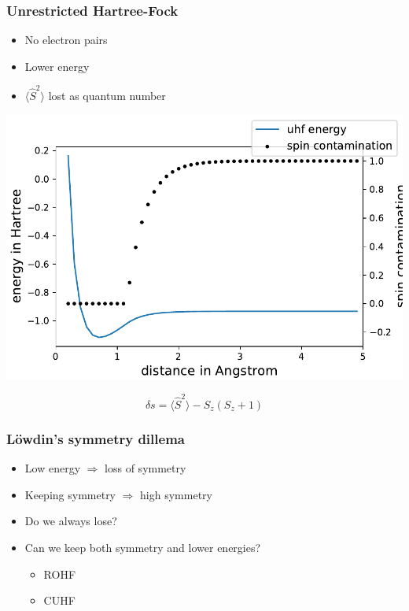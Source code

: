 \documentclass[aspectratio=169]{beamer}
\begin{document}
\begin{frame}
    \frametitle{Unrestricted Hartree-Fock}
    \begin{itemize}
        \item No electron pairs
        \item Lower energy
        \item $\langle\hat{S}^2\rangle$ lost as quantum number
    \end{itemize}
    \begin{minipage}[b]{0.6\linewidth}
        \includegraphics[width=\linewidth]{./figures/uhf.pdf}
    \end{minipage}
    \begin{minipage}[b]{0.35\linewidth}
        \begin{equation}
            \delta s = \langle \hat{S}^2 \rangle - S_z(S_z + 1)
        \end{equation}
    \end{minipage}
\end{frame}


\begin{frame}
    \frametitle{Löwdin's symmetry dillema}
    \begin{itemize}
        \item Low energy $\Longrightarrow$ loss of symmetry
        \item Keeping symmetry $\Longrightarrow$ high symmetry
        \item Do we always lose?
    \end{itemize}


\begin{itemize}
    \item Can we keep both symmetry and lower energies?
    \begin{itemize}
        \item ROHF
        \item CUHF
    \end{itemize}
\end{itemize}

\end{frame}
\end{document}
